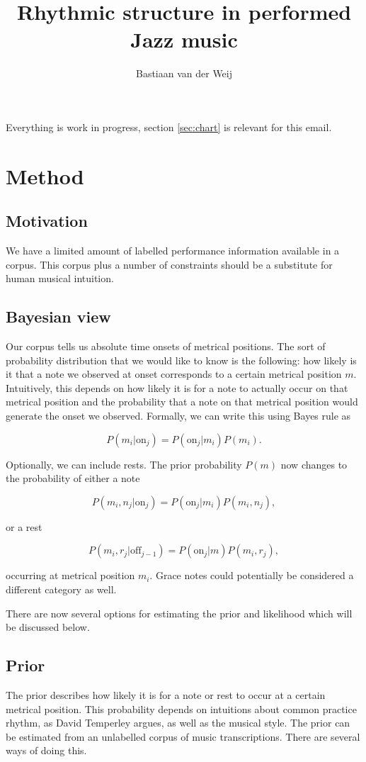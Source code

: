 \documentclass[a4paper,10pt]{article}
\title{Rhythmic structure in performed Jazz music}
\author{Bastiaan van der Weij}
\begin{document}
\begin{large}
Everything is work in progress, section \ref{sec:chart} is relevant for this email.
\end{large}

\section{Method}
\label{sec:method}


\subsection{Motivation}

We have a limited amount of labelled performance information available in a corpus. This corpus plus a number of constraints should be a substitute for human musical intuition.

\subsection{Bayesian view}

Our corpus tells us absolute time onsets of metrical positions. The sort of probability distribution that we would like to know is the following: how likely is it that a note we observed at onset corresponds to a certain metrical position $m$. Intuitively, this depends on how likely it is for a note to actually occur on that metrical position and the probability that a note on that metrical position would generate the onset we observed. Formally, we can write this using Bayes rule as

\[P(m_i|\textrm{on}_j) = P(\textrm{on}_j|m_i)P(m_i).\]

Optionally, we can include rests. The prior probability $P(m)$ now changes to the probability of either a note 

\[P(m_i,n_j|\textrm{on}_j) = P(\textrm{on}_j|m_i)P(m_i,n_j),\]

or a rest

\[P(m_i,r_j|\textrm{off}_{j-1}) = P(\textrm{on}_j|m)P(m_i,r_j),\]

occurring at metrical position $m_i$. Grace notes could potentially be considered a different category as well.

There are now several options for estimating the prior and likelihood which will be discussed below.

\subsection{Prior}
The prior describes how likely it is for a note or rest to occur at a certain metrical position. This probability depends on intuitions about common practice rhythm, as David Temperley argues, as well as the musical style. The prior can be estimated from an unlabelled corpus of music transcriptions. There are several ways of doing this.
\end{document}
